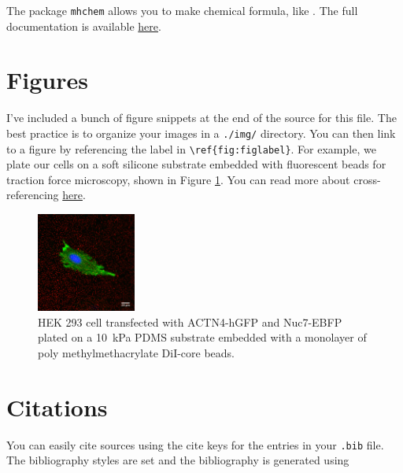 \documentclass[titlepage,12pt]{article}
\begin{document}
The package \texttt{mhchem} allows you to make chemical formula, like . The full documentation is available \href{ftp://www.ctan.org/tex-archive/macros/latex/contrib/mhchem/mhchem.pdf}{here}.

\section{Figures}
I've included a bunch of figure snippets at the end of the source for this file. The best practice is to organize your images in a \texttt{./img/} directory. You can then link to a figure by referencing the label in \verb|\ref{fig:figlabel}|. For example, we plate our cells on a soft silicone substrate embedded with fluorescent beads for traction force microscopy, shown in Figure \ref{fig:TFM}. You can read more about cross-referencing \href{https://en.wikibooks.org/wiki/LaTeX/Labels_and_Cross-referencing}{here}.

\begin{figure}[!ht]
  \begin{center}
    \includegraphics[width=0.29\textwidth]{img/Composite_scalebar_pos88}
  \end{center}
  \caption{HEK 293 cell transfected with ACTN4-hGFP and Nuc7-EBFP plated on a \SI{10}{\kilo\pascal} PDMS substrate embedded with a monolayer of poly methylmethacrylate DiI-core beads.}
  \label{fig:TFM}
\end{figure}


\section{Citations}
You can easily cite sources using the cite keys for the entries in your \texttt{.bib} file. The bibliography styles are set and the bibliography is generated using
\begin{verbatim}


\end{verbatim}
\end{document}
